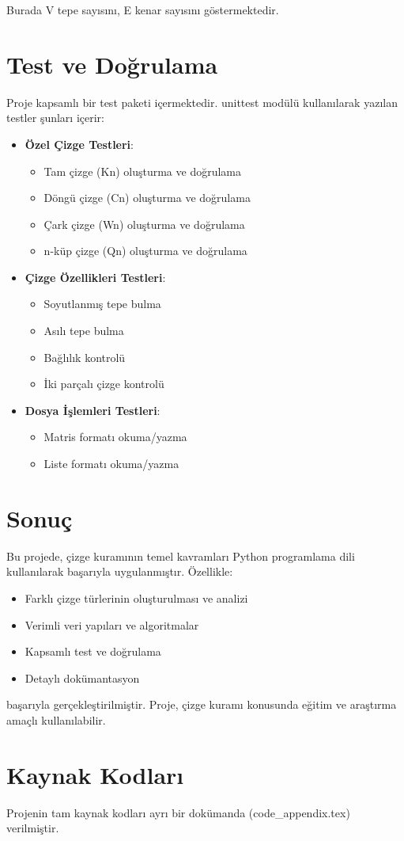 \documentclass[12pt]{article}
\begin{document}
Burada V tepe sayısını, E kenar sayısını göstermektedir.

\section{Test ve Doğrulama}
Proje kapsamlı bir test paketi içermektedir. unittest modülü kullanılarak yazılan testler şunları içerir:

\begin{itemize}
    \item \textbf{Özel Çizge Testleri}:
    \begin{itemize}
        \item Tam çizge (Kn) oluşturma ve doğrulama
        \item Döngü çizge (Cn) oluşturma ve doğrulama
        \item Çark çizge (Wn) oluşturma ve doğrulama
        \item n-küp çizge (Qn) oluşturma ve doğrulama
    \end{itemize}
    \item \textbf{Çizge Özellikleri Testleri}:
    \begin{itemize}
        \item Soyutlanmış tepe bulma
        \item Asılı tepe bulma
        \item Bağlılık kontrolü
        \item İki parçalı çizge kontrolü
    \end{itemize}
    \item \textbf{Dosya İşlemleri Testleri}:
    \begin{itemize}
        \item Matris formatı okuma/yazma
        \item Liste formatı okuma/yazma
    \end{itemize}
\end{itemize}

\section{Sonuç}
Bu projede, çizge kuramının temel kavramları Python programlama dili kullanılarak başarıyla uygulanmıştır. Özellikle:

\begin{itemize}
    \item Farklı çizge türlerinin oluşturulması ve analizi
    \item Verimli veri yapıları ve algoritmalar
    \item Kapsamlı test ve doğrulama
    \item Detaylı dokümantasyon
\end{itemize}

başarıyla gerçekleştirilmiştir. Proje, çizge kuramı konusunda eğitim ve araştırma amaçlı kullanılabilir.

\appendix
\section{Kaynak Kodları}
Projenin tam kaynak kodları ayrı bir dokümanda (code\_appendix.tex) verilmiştir.
\end{document}
